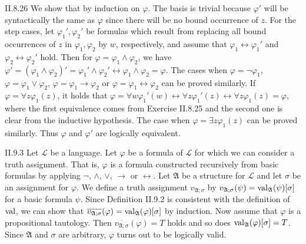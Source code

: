 \documentclass[12pt]{article}
\begin{document}
\begin{customthm}{II.8.26}
  We show that by induction on $\varphi$. The basis is trivial because $\varphi'$ will be syntactically the same as $\varphi$ since there will be no bound occurrence of $z$. For the step cases, let $\varphi_1',\varphi_2'$ be formulas which result from replacing all bound occurrences of $z$ in $\varphi_1,\varphi_2$ by $w$, respectively, and assume that $\varphi_1\leftrightarrow\varphi_1'$ and $\varphi_2\leftrightarrow\varphi_2'$ hold. Then for $\varphi=\varphi_1\wedge\varphi_2$, we have $\varphi'=(\varphi_1\wedge\varphi_2)'=\varphi_1'\wedge\varphi_2'\leftrightarrow\varphi_1\wedge\varphi_2=\varphi$. The cases when $\varphi=\neg\varphi_1$, $\varphi=\varphi_1\vee\varphi_2$, $\varphi=\varphi_1\rightarrow\varphi_2$ or $\varphi=\varphi_1\leftrightarrow\varphi_2$ can be proved similarly. If $\varphi=\forall z\varphi_1(z)$, it holds that $\varphi=\forall w\varphi_1'(w)\leftrightarrow\forall z\varphi_1'(z)\leftrightarrow\forall z\varphi_1(z)=\varphi$, where the first equivalence comes from Exercise II.8.25 and the second one is clear from the inductive hypothesis. The case when $\varphi=\exists z\varphi_1(z)$ can be proved similarly. Thus $\varphi$ and $\varphi'$ are logically equivalent.
\end{customthm}

\begin{customthm}{II.9.3}
  Let $\mathcal{L}$ be a language. Let $\varphi$ be a formula of $\mathcal{L}$ for which we can consider a truth assignment. That is, $\varphi$ is a formula constructed recursively from basic formulas by applying $\neg$, $\wedge$, $\vee$, $\rightarrow$ or $\leftrightarrow$. Let $\mathfrak{A}$ be a structure for $\mathcal{L}$ and let $\sigma$ be an assignment for $\varphi$. We define a truth assignment $v_{\mathfrak{A};\sigma}$ by $v_{\mathfrak{A};\sigma}(\psi)=\mathop{\mathrm{val}}_\mathfrak{A}(\psi)[\sigma]$ for a basic formula $\psi$. Since Definition II.9.2 is consistent with the definition of $\mathop{\mathrm{val}}$, we can show that $\overline{v_{\mathfrak{A};\sigma}}(\varphi)=\mathop{\mathrm{val}}_\mathfrak{A}(\varphi)[\sigma]$ by induction. Now assume that $\varphi$ is a propositional tautology. Then $\overline{v_{\mathfrak{A};\sigma}}(\varphi)=T$ holds and so does $\mathop{\mathrm{val}}_\mathfrak{A}(\varphi)[\sigma]=T$. Since $\mathfrak{A}$ and $\sigma$ are arbitrary, $\varphi$ turns out to be logically valid.
\end{customthm}
\end{document}
